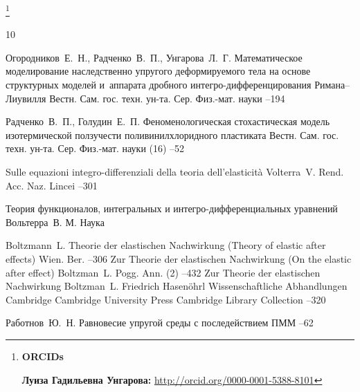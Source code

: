\thanks{{\bf ORCIDs}

{\bf Луиза Гадильевна Унгарова:} \url{http://orcid.org/0000-0001-5388-8101}

}


\RusRef
\begin{thebibliography}{10}

\by Огородников~Е.~Н., Радченко~В.~П., Унгарова~Л.~Г.
\paper Математическое моделирование наследственно упругого деформируемого тела
на основе структурных моделей и~аппарата дробного
интегро-дифференцирования Римана--Лиувилля
\serial Вестн. Сам. гос. техн. ун-та. Сер. Физ.-мат. науки
--194

\by Радченко~В.~П., Голудин~Е.~П.
\paper Феноменологическая стохастическая модель изотермической ползучести поливинилхлоридного пластиката
\jour Вестн. Сам. гос. техн. ун-та. Сер. Физ.-мат. науки
(16)
--52

\paper Sulle equazioni integro-differenziali della teoria dell'elasticit\`a
\by Volterra~V.
\jour Rend. Acc. Naz. Lincei
–301

\book Теория функционалов, интегральных и интегро-дифференциальных уравнений
\by Вольтерра~В.
\publaddr М.
\publ Наука

\by Boltzmann~L.
\paper Theorie der elastischen Nachwirkung (Theory of elastic after effects)
\jour Wien. Ber.
–306\!\!
\moreref
\paper  Zur Theorie der elastischen Nachwirkung (On the elastic after effect)
\by    Boltzman~L.
\jour Pogg. Ann. \rm (2)
--432\!\!
\moreref
\paper  Zur Theorie der elastischen Nachwirkung
\by    Boltzman~L.
\ed  Friedrich Hasen\"ohrl
\inbook Wissenschaftliche Abhandlungen
\publaddr Cambridge
\publ Cambridge University Press
\serial Cambridge Library Collection
--320

\by Работнов~Ю.~Н.
\paper Равновесие упругой среды с последействием
\jour ПММ
--62


\end{thebibliography}
